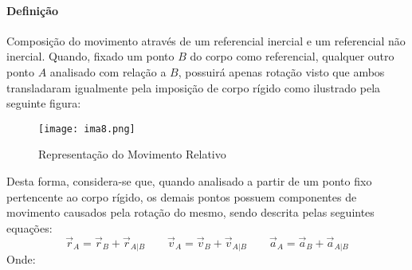 \documentclass{article}
\begin{document}
            \paragraph{Definição}Composição do movimento através de um referencial inercial e um referencial não inercial. Quando, fixado um ponto $B$ do corpo como referencial, qualquer outro ponto $A$ analisado com relação a $B$, possuirá apenas rotação visto que ambos transladaram igualmente pela imposição de corpo rígido como ilustrado pela seguinte figura:
                \begin{figure}[H]
                    \centering
                    \texttt{[image: ima8.png]}
                    \caption{Representação do Movimento Relativo}
                \end{figure} \noindent
            Desta forma, considera-se que, quando analisado a partir de um ponto fixo pertencente ao corpo rígido, os demais pontos possuem componentes de movimento causados pela rotação do mesmo, sendo descrita pelas seguintes equações:
                \begin{equation}
                    \boxed{
                        \vec{r}_{A} = \vec{r}_{B} + \vec{r}_{A|B}
                    }
                    \qquad
                    \boxed{
                        \vec{v}_{A} = \vec{v}_{B} + \vec{v}_{A|B}
                    }
                    \qquad
                    \boxed{
                        \vec{a}_{A} = \vec{a}_{B} + \vec{a}_{A|B}
                    }
                \end{equation}
            Onde:
\end{document}
